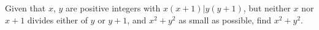 Given that $x$, $y$ are positive integers with $x(x+1)|y(y+1)$, but neither $x$ nor $x+1$ divides either of $y$ or $y+1$, and $x^2 + y^2$ as small as possible, find $x^2 + y^2$.
